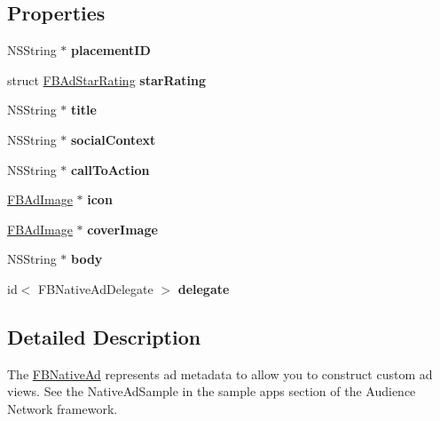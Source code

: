 \subsection*{Properties}
\begin{DoxyCompactItemize}
\item 
\mbox{\label{interfaceFBNativeAd_a35bd530b2ee24c808eeee509f5871e56}} 
N\+S\+String $\ast$ {\bfseries placement\+ID}
\item 
\mbox{\label{interfaceFBNativeAd_aa396b356858f67547436860dcc660b86}} 
struct \hyperlink{structFBAdStarRating}{F\+B\+Ad\+Star\+Rating} {\bfseries star\+Rating}
\item 
\mbox{\label{interfaceFBNativeAd_ab683dfb0b340b083253c9e3094f5b7ce}} 
N\+S\+String $\ast$ {\bfseries title}
\item 
\mbox{\label{interfaceFBNativeAd_af1f3ad50b04064d76699f539cb34fd59}} 
N\+S\+String $\ast$ {\bfseries social\+Context}
\item 
\mbox{\label{interfaceFBNativeAd_a88f4d24b5acd09f7580b191ab4e91eb1}} 
N\+S\+String $\ast$ {\bfseries call\+To\+Action}
\item 
\mbox{\label{interfaceFBNativeAd_afd55c595592e386cabe56d0ce4989781}} 
\hyperlink{interfaceFBAdImage}{F\+B\+Ad\+Image} $\ast$ {\bfseries icon}
\item 
\mbox{\label{interfaceFBNativeAd_a79b9e99bf88a675503c99aa686d20475}} 
\hyperlink{interfaceFBAdImage}{F\+B\+Ad\+Image} $\ast$ {\bfseries cover\+Image}
\item 
\mbox{\label{interfaceFBNativeAd_acf849c2fe2b0475bce8bda6bff408652}} 
N\+S\+String $\ast$ {\bfseries body}
\item 
\mbox{\label{interfaceFBNativeAd_a8bed8f29f497c274eaf025a5eb7b933b}} 
id$<$ F\+B\+Native\+Ad\+Delegate $>$ {\bfseries delegate}
\end{DoxyCompactItemize}


\subsection{Detailed Description}
The \hyperlink{interfaceFBNativeAd}{F\+B\+Native\+Ad} represents ad metadata to allow you to construct custom ad views. See the Native\+Ad\+Sample in the sample apps section of the Audience Network framework. 

